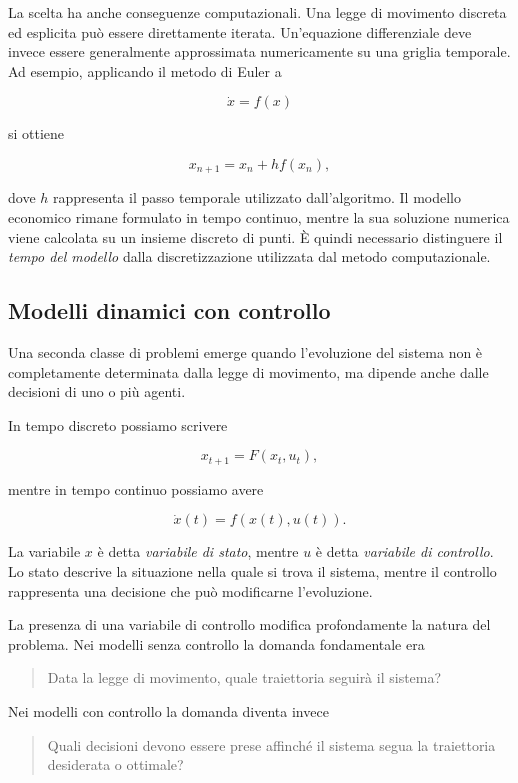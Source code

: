 \documentclass{book}
\begin{document}
La scelta ha anche conseguenze computazionali. Una legge di movimento discreta ed esplicita può essere direttamente iterata. Un'equazione differenziale deve invece essere generalmente approssimata numericamente su una griglia temporale. Ad esempio, applicando il metodo di Euler a

$$
\dot{x}=f(x)
$$

si ottiene

$$
x_{n+1}=x_n+h f(x_n),
$$

dove $h$ rappresenta il passo temporale utilizzato dall'algoritmo. Il modello economico rimane formulato in tempo continuo, mentre la sua soluzione numerica viene calcolata su un insieme discreto di punti. È quindi necessario distinguere il \emph{tempo del modello} dalla discretizzazione utilizzata dal metodo computazionale.

\subsection{Modelli dinamici con controllo}

Una seconda classe di problemi emerge quando l'evoluzione del sistema non è completamente determinata dalla legge di movimento, ma dipende anche dalle decisioni di uno o più agenti.

In tempo discreto possiamo scrivere

$$
x_{t+1}=F(x_t,u_t),
$$

mentre in tempo continuo possiamo avere

$$
\dot{x}(t)=f(x(t),u(t)).
$$

La variabile $x$ è detta \emph{variabile di stato}, mentre $u$ è detta \emph{variabile di controllo}. Lo stato descrive la situazione nella quale si trova il sistema, mentre il controllo rappresenta una decisione che può modificarne l'evoluzione.

La presenza di una variabile di controllo modifica profondamente la natura del problema. Nei modelli senza controllo la domanda fondamentale era

\begin{quote}
Data la legge di movimento, quale traiettoria seguirà il sistema?
\end{quote}

Nei modelli con controllo la domanda diventa invece

\begin{quote}
Quali decisioni devono essere prese affinché il sistema segua la traiettoria desiderata o ottimale?
\end{quote}
\end{document}
